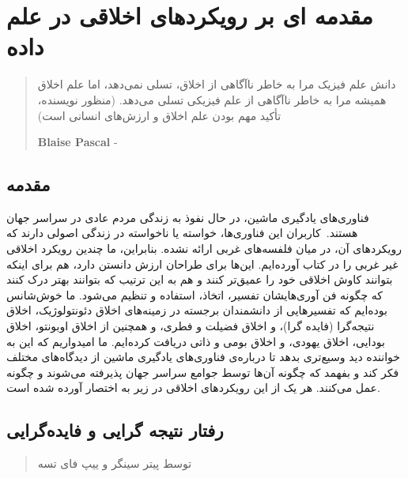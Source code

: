 

\chapter{مقدمه ای بر رویکردهای اخلاقی در علم داده}
\label{ch:مقدمه ای بر رویکردهای اخلاقی در علم داده}

\begin{quote}
    دانش علم فیزیک مرا به خاطر ناآگاهی از اخلاق، تسلی نمی‌دهد، اما علم اخلاق همیشه مرا به خاطر ناآگاهی از علم فیزیکی تسلی می‌دهد.
    (منظور نویسنده، تأکید مهم بودن علم اخلاق و ارزش‌های انسانی است)
    \begin{flushleft}
        \textenglish{\textbf{Blaise Pascal} -}
    \end{flushleft}
\end{quote}

\section*{مقدمه}
فناوری‌های یادگیری ماشین، در حال نفوذ به زندگی مردم عادی در سراسر جهان هستند.\     كاربران اين فناوری‌ها، خواسته یا ناخواسته در زندگی اصولی دارند که رویکردهای آن، در میان فلفسه‌های غربی ارائه نشده.
بنابراین، ما چندین رویکرد اخلاقی غیر غربی را در کتاب آورده‌ایم.
این‌ها برای طراحان ارزش دانستن دارد، هم برای اینکه بتوانند کاوش اخلاقی خود را عمیق‌تر کنند و هم به این ترتیب که بتوانند بهتر درک کنند که چگونه فن آوری‌هایشان تفسیر، اتخاذ، استفاده و تنظیم می‌شود.
ما خوش‌شانس بوده‌ایم که تفسیرهایی از دانشمندان برجسته در زمینه‌های اخلاق دئونتولوژیک، اخلاق نتیجه‌گرا (فایده گرا)، و اخلاق فضیلت و فطری، و همچنین از اخلاق اوبونتو، اخلاق بودایی، اخلاق یهودی، و اخلاق بومی و ذاتی دریافت کرده‌ایم.
ما امیدواریم که این به خواننده دید وسیع‌تری بدهد تا درباره‌ی فناوری‌های یادگیری ماشین از دیدگاه‌های مختلف فکر کند و بفهمد که چگونه آن‌ها توسط جوامع سراسر جهان پذیرفته می‌شوند و چگونه عمل می‌کنند.
هر یک از این رویکردهای اخلاقی در زیر به اختصار آورده شده است.

\section*{رفتار نتیجه گرایی و فایده‌گرایی}
\begin{quote}
    توسط پیتر سینگر و ییپ فای تسه
\end{quote}

